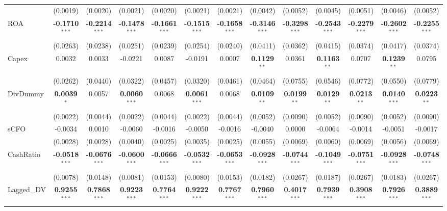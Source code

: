\documentclass[11pt,a4paper]{article}
\begin{document}
\begin{table}[htbp]
\begin{tabular}{lcccccccccccc}
 & (0.0019) & (0.0020) & (0.0021) & (0.0020) & (0.0021) & (0.0021) & (0.0042) & (0.0052) & (0.0045) & (0.0051) & (0.0046) & (0.0052) \\
ROA & \textbf{-0.1710}$^{***}$ & \textbf{-0.2214}$^{***}$ & \textbf{-0.1478}$^{***}$ & \textbf{-0.1661}$^{***}$ & \textbf{-0.1515}$^{***}$ & \textbf{-0.1658}$^{***}$ & \textbf{-0.3146}$^{***}$ & \textbf{-0.3298}$^{***}$ & \textbf{-0.2543}$^{***}$ & \textbf{-0.2279}$^{***}$ & \textbf{-0.2602}$^{***}$ & \textbf{-0.2255}$^{***}$ \\
 & (0.0263) & (0.0238) & (0.0251) & (0.0239) & (0.0254) & (0.0240) & (0.0411) & (0.0362) & (0.0415) & (0.0374) & (0.0417) & (0.0374) \\
Capex & 0.0032 & 0.0033 & -0.0221 & 0.0087 & -0.0191 & 0.0007 & \textbf{0.1129}$^{**}$ & 0.0361 & \textbf{0.1163}$^{**}$ & 0.0707 & \textbf{0.1239}$^{**}$ & 0.0795 \\
 & (0.0262) & (0.0440) & (0.0322) & (0.0457) & (0.0320) & (0.0461) & (0.0464) & (0.0755) & (0.0546) & (0.0772) & (0.0550) & (0.0779) \\
DivDummy & \textbf{0.0039}$^{*}$ & 0.0057 & \textbf{0.0060}$^{***}$ & 0.0068 & \textbf{0.0061}$^{***}$ & 0.0068 & \textbf{0.0109}$^{**}$ & \textbf{0.0199}$^{**}$ & \textbf{0.0129}$^{**}$ & \textbf{0.0213}$^{**}$ & \textbf{0.0140}$^{***}$ & \textbf{0.0223}$^{**}$ \\
 & (0.0022) & (0.0044) & (0.0022) & (0.0044) & (0.0022) & (0.0044) & (0.0052) & (0.0090) & (0.0052) & (0.0090) & (0.0052) & (0.0090) \\
sCFO & -0.0034 & 0.0010 & -0.0060 & -0.0016 & -0.0050 & -0.0016 & -0.0040 & 0.0000 & -0.0064 & -0.0014 & -0.0051 & -0.0017 \\
 & (0.0028) & (0.0028) & (0.0040) & (0.0025) & (0.0035) & (0.0025) & (0.0055) & (0.0069) & (0.0060) & (0.0069) & (0.0056) & (0.0069) \\
CashRatio & \textbf{-0.0518}$^{***}$ & \textbf{-0.0676}$^{***}$ & \textbf{-0.0600}$^{***}$ & \textbf{-0.0666}$^{***}$ & \textbf{-0.0532}$^{***}$ & \textbf{-0.0653}$^{***}$ & \textbf{-0.0928}$^{***}$ & \textbf{-0.0744}$^{***}$ & \textbf{-0.1049}$^{***}$ & \textbf{-0.0751}$^{***}$ & \textbf{-0.0928}$^{***}$ & \textbf{-0.0748}$^{***}$ \\
 & (0.0078) & (0.0148) & (0.0081) & (0.0153) & (0.0080) & (0.0153) & (0.0182) & (0.0267) & (0.0187) & (0.0267) & (0.0183) & (0.0267) \\
Lagged\_DV & \textbf{0.9255}$^{***}$ & \textbf{0.7868}$^{***}$ & \textbf{0.9223}$^{***}$ & \textbf{0.7764}$^{***}$ & \textbf{0.9222}$^{***}$ & \textbf{0.7767}$^{***}$ & \textbf{0.7960}$^{***}$ & \textbf{0.4017}$^{***}$ & \textbf{0.7939}$^{***}$ & \textbf{0.3908}$^{***}$ & \textbf{0.7926}$^{***}$ & \textbf{0.3889}$^{***}$ \\

\end{tabular}
\end{table}
\end{document}
